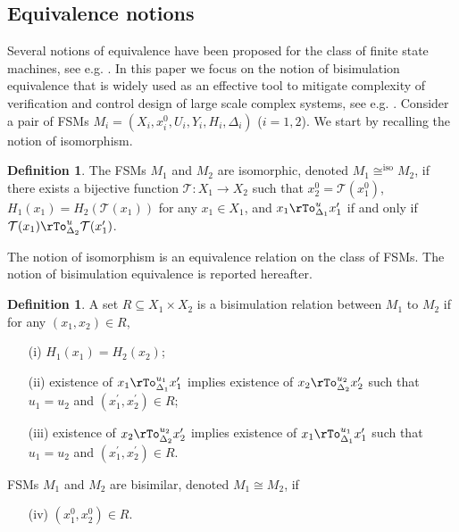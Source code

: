 \documentclass{amsart}
\theoremstyle{definition}
\newtheorem{definition}[theorem]{Definition}
\theoremstyle{remark}
\numberwithin{equation}{section}
\newcommand{\iso}{\mathrm{iso}}
\begin{document}
\subsection{Equivalence notions}
Several notions of equivalence have been proposed for the class of finite state machines, see e.g. \cite{Spectrum}. 
In this paper we focus on the notion of bisimulation equivalence \cite{Milner,Park} that 
is widely used as an effective tool to mitigate complexity of verification and control design of large scale complex systems, see e.g. \cite{ModelChecking}. 
Consider a pair of FSMs $M_{i}=(X_{i},x^{0}_{i},U_{i},Y_{i},H_{i},\Delta_{i})$ ($i=1,2$). 
We start by recalling the notion of isomorphism. 
\begin{definition}
\label{DefIso}
The FSMs $M_{1}$ and $M_{2}$ are isomorphic, denoted $M_{1} \cong^{\iso} M_{2}$, if there exists a bijective function $\mathcal{T}:X_{1}\rightarrow X_{2}$ such that 
$x^{0}_{2}=\mathcal{T}(x^{0}_{1})$, $H_{1}(x_{1})=H_{2}(\mathcal{T}(x_{1}))$ for any $x_{1}\in X_{1}$, and $x_{1}\rTo^{u}_{\Delta_{1}} x^{\prime}_{1}$ if and only if $\mathcal{T}(x_{1})\rTo^{u}_{\Delta_{2}} \mathcal{T}(x^{\prime}_{1})$. 
\end{definition}
The notion of isomorphism is an equivalence relation on the class of FSMs. 
The notion of bisimulation equivalence is reported hereafter.
\begin{definition}
\label{Bis} 
A set $R\subseteq X_{1}\times X_{2}$ is a bisimulation relation between $M_{1}$ to $M_{2}$ if for any $(x_{1},x_{2})\in R$,
\begin{itemize}
\item[(i)] $H_{1}(x_{1})=H_{2}(x_{2})$;
\item[(ii)] existence of $x_{1} \rTo^{u_{1}}_{\Delta_{1}} x_{1}^{\prime}$ implies existence of $x_{2} \rTo^{u_{2}}_{\Delta_{2}} x_{2}^{\prime}$ such that $u_{1}=u_{2}$ and $(x_{1}^{\prime},x_{2}^{\prime})\in R$;
\item[(iii)] existence of $x_{2} \rTo^{u_{2}}_{\Delta_{2}} x_{2}^{\prime}$ implies existence of $x_{1} \rTo^{u_{1}}_{\Delta_{1}} x_{1}^{\prime}$ such that $u_{1}=u_{2}$ and $(x_{1}^{\prime},x_{2}^{\prime})\in R$.
\end{itemize}
FSMs $M_{1}$ and $M_{2}$ are bisimilar, denoted $M_{1} \cong M_{2}$, if 
\begin{itemize}
\item[(iv)] \mbox{$(x^{0}_{1},x^{0}_{2})\in R$}.
\end{itemize}
\end{definition}
\end{document}
